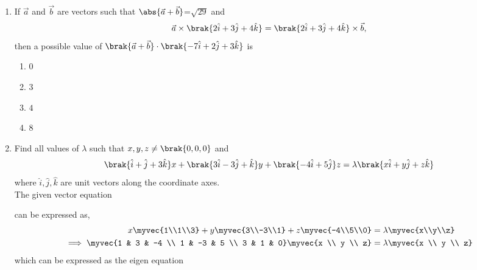 \begin{enumerate}[label=\thesubsection.\arabic*.,ref=\thesubsection.\theenumi]
         \item %
		 If $\vec{a}$ and $\vec{b}$ are vectors such that $\abs{\vec{a}+\vec{b}}$=$\sqrt{29}$ and $$\vec{a}\times\brak{2\hat{i}+3\hat{j}+4\hat{k}} = \brak{2\hat{i}+3\hat{j}+4\hat{k}}\times\vec{b},$$ then a possible value of $\brak{\vec{a}+\vec{b}}\cdot\brak{-7\hat{i}+2\hat{j}+3\hat{k}}$ is \hfill{}
    \begin{multicols}{4} 
\begin{enumerate}
        \item $0$                             
        \item $3$                           
        \item $4$            
        \item $8$
\end{enumerate}
    \end{multicols}
	\item Find all values of $\lambda$ such that $x,y,z\neq\brak{0,0,0}$ and $$\brak{\hat{i}+\hat{j}+3\hat{k}}x+\brak{3\hat{i}-3\hat{j}+\hat{k}}y+\brak{-4\hat{i}+5\hat{j}}z=\lambda\brak{x\hat{i}+y\hat{j}+z\hat{k}}$$ where $\hat{i}, \hat{j}, \hat{k}$ are unit vectors along the coordinate axes. \hfill{}
		\\
		\solution 
		The given vector equation 
		\iffalse
\begin{align}
(\hat{i} + \hat{j} + 3\hat{k})x + (3\hat{i} - 3\hat{j} + \hat{k})y + (-4\hat{i} + 5\hat{j})z = \lambda(x\hat{i} + y\hat{j} + z\hat{k})
\end{align}\\
\fi
 can be expressed as,
\begin{align}
	x\myvec{1\\1\\3} + y\myvec{3\\-3\\1} + z\myvec{-4\\5\\0} &= \lambda\myvec{x\\y\\z}
	\\
\implies \myvec{1 & 3 & -4 \\ 1 & -3 & 5 \\ 3 & 1 & 0}\myvec{x \\ y \\ z} &= \lambda\myvec{x \\ y \\ z}
\end{align}
which can be expressed as the eigen equation

\end{enumerate}
